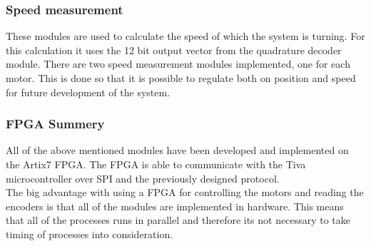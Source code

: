 \documentclass[../../../main]{subfiles}
\begin{document}
\subsubsection{Speed measurement}
These modules are used to calculate the speed of which the system is turning. For this calculation it uses the 12 bit output vector from the quadrature decoder module.
There are two speed measurement modules implemented, one for each motor.
This is done so that it is possible to regulate both on position and speed for future development of the system.

\subsubsection{FPGA Summery}
All of the above mentioned modules have been developed and implemented on the Artix7 FPGA.
The FPGA is able to communicate with the Tiva microcontroller over  SPI and the previously designed protocol.
\\
The big advantage with  using a FPGA for controlling the motors and reading the encoders is that all of the modules are implemented in hardware.
This means that all of the processes runs  in parallel and therefore its not necessary to take timing of processes into consideration.
\end{document}
